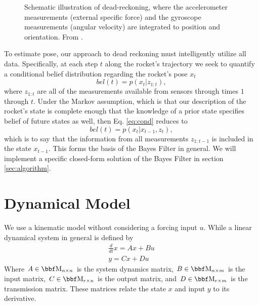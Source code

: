 \documentclass{article}
\begin{document}
\begin{figure}[ht]
  \centering
  \caption{Schematic illustration of dead-reckoning, where the accelerometer measurements (external specific force) and the gyroscope measurements (angular velocity) are integrated to position and orientation. From \cite{1}.}
  \label{fig:dr}
\end{figure}

To estimate pose, our approach to dead reckoning must intelligently utilize all data. Specifically, at each step $t$ along the rocket's trajectory we seek to quantify a conditional belief distribution regarding the rocket's pose $x_t$
\[ \label{eq:cond}
bel(t) = p(x_t | z_{1:t}),
\]
where $z_{1:t}$ are all of the measurements available from sensors through times $1$ through $t$. Under the Markov assumption, which is that our description of the rocket's state is complete enough that the knowledge of a prior state specifies belief of future states as well, then Eq. \ref{eq:cond} reduces to
\[
bel(t) = p(x_t | x_{t-1}, z_t),
\]
which is to say that the information from all measurements $z_{1:t-1}$ is included in the state $x_{t-1}$. This forms the basis of the Bayes Filter in general. We will implement a specific closed-form solution of the Bayes Filter in section \ref{sec:algorithm}.

\section{Dynamical Model} \label{sec:dynmod}
We use a kinematic model without considering a forcing input $u$. While a linear dynamical system in general is defined by 
\begin{align*}
\frac{d}{dt} x = A x + B u\\
y = C x + D u
\end{align*}
Where $A \in \MM_{n \times n}$ is the system dynamics matrix, $B \in \MM_{n \times m}$ is the input matrix, $C \in \MM_{r \times n}$ is the output matrix, and $D \in \MM_{r \times m}$ is the transmission matrix. These matrices relate the state $x$ and input $y$ to its derivative.
\end{document}

